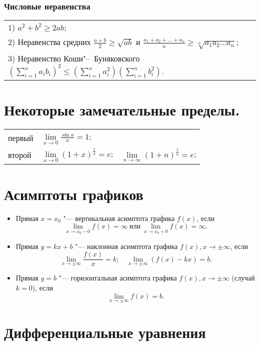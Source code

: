 \subsubsection{Числовые неравенства}

\begin{longtable}[l]{l}
	1) $a^2+b^2 \ge 2ab;$ \\
	2) Неравенства средних $\frac{a+b}{2} \ge \sqrt{ab}$ и $\frac{a_1+a_2+\ldots+a_n}{n} \ge \sqrt[n]{a_1 a_2\ldots a_n}$; \\
	3) Неравенство Коши"--~Буняковского $\left(\sum_{i=1}^n a_i b_i\right)^2 \le \left(\sum_{i=1}^n a_i^2\right) \left(\sum_{i=1}^n b_i^2\right)$.
\end{longtable}

\section{Некоторые замечательные пределы.}
\begin{longtable}[l]{l l l}
первый & 
$\lim\limits_{x\to0}\frac{\sin x}{x}=1$;
&
\\
второй & 
$\lim\limits_{x\to0} (1+x)^{\frac{1}{x}}=e$; &
$\lim\limits_{n\to\infty}\left(1+n\right)^{\frac{1}{n}}=e$;
\end{longtable}

\section{Асимптоты графиков}
\begin{itemize}[wide, labelindent = 0pt]
\item
Прямая $x=x_0$ "--- вертикальная асимптота графика $f(x)$, если $$\lim\limits_{x\to x_0-0}f(x)=\infty\ \text{или}\ \lim\limits_{x\to x_0+0}f(x)=\infty.$$ 
\item
Прямая $y=kx+b$ "--- наклонная асимптота графика $f(x), x\to\pm\infty$, если $$\lim\limits_{x\to\pm\infty}\frac{f(x)}{x}=k; \quad \lim\limits_{x\to\pm\infty} (f(x)-kx)=b.$$
\item
Прямая $y=b$ "--- горизонтальная асимптота графика $f(x), x\to\pm\infty$ (случай $k=0$), если $$ \lim\limits_{x\to\pm\infty} f(x)=b.$$
\end{itemize}

\section{Дифференциальные уравнения}
